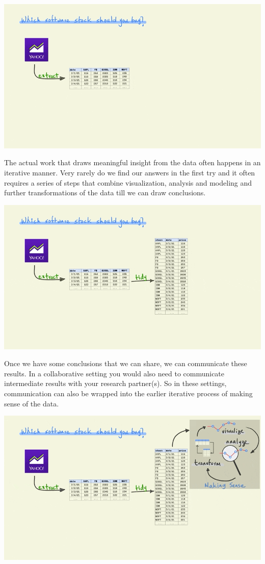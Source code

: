 \documentclass[
]{book}
\begin{document}
\includegraphics{assets/packages/gifs/tidy.gif}

The actual work that draws meaningful insight from the data often happens in an iterative manner. Very rarely do we find our answers in the first try and it often requires a series of steps that combine visualization, analysis and modeling and further transformations of the data till we can draw conclusions.

\includegraphics{assets/packages/gifs/make_sense.gif}

Once we have some conclusions that we can share, we can communicate these results. In a collaborative setting you would also need to communicate intermediate results with your research partner(s). So in these settings, communication can also be wrapped into the earlier iterative process of making sense of the data.

\includegraphics{assets/packages/gifs/communicate.gif}
\end{document}
